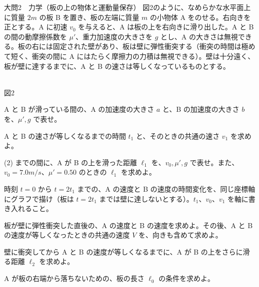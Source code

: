 \documentclass[paper=b5, fontsize=8pt, fleqn, twoside]{jlreq}
\begin{document}
\clearpage
\begin{ascolorbox4A}[75点・30分]{大問2　力学（板の上の物体と運動量保存）}
図2のように、なめらかな水平面上に質量 $2m$ の板 B を置き、板の左端に質量 $m$ の小物体 A をのせる。右向きを正とする。A に初速 $v_0$ を与えると、A は板の上を右向きに滑り出した。A と B の間の動摩擦係数を $\mu'$、重力加速度の大きさを $g$ とし、A の大きさは無視できる。板の右には固定された壁があり、板は壁に弾性衝突する（衝突の時間は極めて短く、衝突の間に A にはたらく摩擦力の力積は無視できる）。壁は十分遠く、板が壁に達するまでに、A と B の速さは等しくなっているものとする。
\begin{center}
\\[1pt]{\small 図2}
\end{center}
\begin{qlist}[series=ub]
\item A と B が滑っている間の、A の加速度の大きさ $a$ と、B の加速度の大きさ $b$ を、$\mu',g$ で表せ。
\item A と B の速さが等しくなるまでの時間 $t_1$ と、そのときの共通の速さ $v_1$ を求めよ。
\item (2) までの間に、A が B の上を滑った距離 $\ell_1$ を、$v_0,\mu',g$ で表せ。また、$v_0=7.0\unit{m/s}$、$\mu'=0.50$ のときの $\ell_1$ を求めよ。
\item 時刻 $t=0$ から $t=2t_1$ までの、A の速度と B の速度の時間変化を、同じ座標軸にグラフで描け（板は $t=2t_1$ までは壁に達しないとする）。$t_1$、$v_0$、$v_1$ を軸に書き入れること。
\item 板が壁に弾性衝突した直後の、A の速度と B の速度を求めよ。その後、A と B の速度が等しくなったときの共通の速度 $V$ を、向きも含めて求めよ。
\item 壁に衝突してから A と B の速度が等しくなるまでに、A が B の上をさらに滑る距離 $\ell_2$ を求めよ。
\item A が板の右端から落ちないための、板の長さ $\ell_0$ の条件を求めよ。
\end{qlist}
\end{ascolorbox4A}
\end{document}
